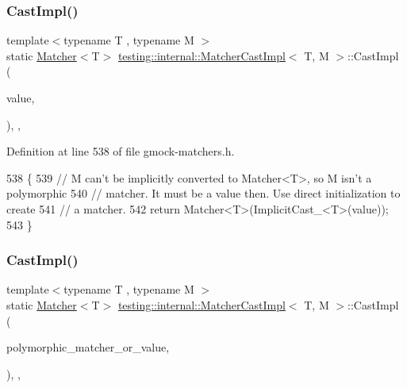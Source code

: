 \subsubsection{\texorpdfstring{Cast\+Impl()}{CastImpl()}\hspace{0.1cm}{\footnotesize\ttfamily [1/2]}}
{\footnotesize\ttfamily template$<$typename T , typename M $>$ \\
static \hyperlink{classtesting_1_1Matcher}{Matcher}$<$T$>$ \hyperlink{classtesting_1_1internal_1_1MatcherCastImpl}{testing\+::internal\+::\+Matcher\+Cast\+Impl}$<$ T, M $>$\+::Cast\+Impl (\begin{DoxyParamCaption}\item[{const M \&}]{value,  }\item[{\hyperlink{structtesting_1_1internal_1_1BooleanConstant}{Boolean\+Constant}$<$ false $>$}]{ }\end{DoxyParamCaption})\hspace{0.3cm}{\ttfamily [inline]}, {\ttfamily [static]}, {\ttfamily [private]}}



Definition at line 538 of file gmock-\/matchers.\+h.


\begin{DoxyCode}
538                                                                      \{
539     \textcolor{comment}{// M can't be implicitly converted to Matcher<T>, so M isn't a polymorphic}
540     \textcolor{comment}{// matcher.  It must be a value then.  Use direct initialization to create}
541     \textcolor{comment}{// a matcher.}
542     \textcolor{keywordflow}{return} Matcher<T>(ImplicitCast\_<T>(value));
543   \}
\end{DoxyCode}
\mbox{\label{classtesting_1_1internal_1_1MatcherCastImpl_a7eef3c9675414f138bf27def2fccd2c7}} 
\subsubsection{\texorpdfstring{Cast\+Impl()}{CastImpl()}\hspace{0.1cm}{\footnotesize\ttfamily [2/2]}}
{\footnotesize\ttfamily template$<$typename T , typename M $>$ \\
static \hyperlink{classtesting_1_1Matcher}{Matcher}$<$T$>$ \hyperlink{classtesting_1_1internal_1_1MatcherCastImpl}{testing\+::internal\+::\+Matcher\+Cast\+Impl}$<$ T, M $>$\+::Cast\+Impl (\begin{DoxyParamCaption}\item[{const M \&}]{polymorphic\+\_\+matcher\+\_\+or\+\_\+value,  }\item[{\hyperlink{structtesting_1_1internal_1_1BooleanConstant}{Boolean\+Constant}$<$ true $>$}]{ }\end{DoxyParamCaption})\hspace{0.3cm}{\ttfamily [inline]}, {\ttfamily [static]}, {\ttfamily [private]}}



